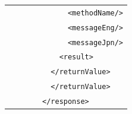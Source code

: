 \documentclass[a4j,10pt,dvips,onecolumn,oneside,final]{jarticle}%
\begin{document}
\begin{table}[htbp]
\begin{center}
{\begin{tabular}{|c|c|c|l|l|}
                  &           &      &                                            & \verb|      <methodName/>|\\ 
                  &           &      &                                            & \verb|      <messageEng/>|\\ 
                  &           &      &                                            & \verb|      <messageJpn/>|\\ 
                  &           &      &                                            & \verb|    <result>|\\ 
                  &           &      &                                            & \verb|  </returnValue>|\\ 
                  &           &      &                                            & \verb|  </returnValue>|\\ 
                  &           &      &                                            & \verb|</response>|\\ \hline


\end{tabular}}
\end{center}
\end{table}
\end{document}

